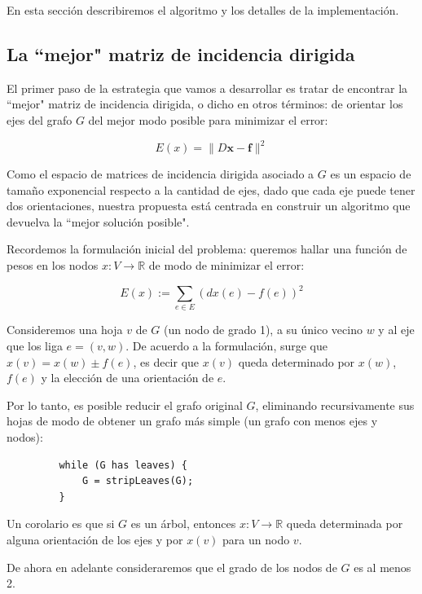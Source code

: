 \documentclass[conference,compsoc,a4paper]{IEEEtran}
\begin{document}
En esta sección describiremos el algoritmo y los detalles de la 
implementación.

\subsection{La ``mejor" matriz de incidencia dirigida}

El primer paso de la estrategia que vamos a desarrollar es tratar de 
encontrar la ``mejor" matriz de incidencia dirigida, o dicho en otros 
términos: de orientar los ejes del grafo $G$ del mejor modo posible para 
minimizar el error:

$$E(x) = \|D\bm{x}-\bm{f}\|^2$$
 
Como el espacio de matrices de incidencia dirigida asociado a $G$ es un 
espacio de tamaño exponencial respecto a la cantidad de ejes, dado que 
cada eje puede tener dos orientaciones, nuestra propuesta está centrada 
en construir un algoritmo que devuelva la ``mejor solución posible".

\bigskip


Recordemos la formulación inicial del problema: queremos hallar una 
función de pesos en los nodos $x: V \rightarrow \mathbb{R}$ de modo de 
minimizar el error:

$$E(x) := \sum_{e \in E} (dx(e) - f(e))^2$$

Consideremos una hoja $v$ de $G$ (un nodo de grado 1), a su único 
vecino $w$ y al eje que los liga $e=(v,w)$. De acuerdo a la formulación, 
surge que $x(v) = x(w) \pm f(e)$, es decir que $x(v)$ queda 
determinado por $x(w)$, $f(e)$ y la elección de una orientación de $e$.

\smallskip

Por lo tanto, es posible reducir el grafo original $G$, eliminando 
recursivamente sus  hojas de modo de obtener un grafo más simple (un 
grafo con menos ejes y nodos):

\begin{verbatim}
         while (G has leaves) {
             G = stripLeaves(G);
         }
\end{verbatim}

Un corolario es que si $G$ es un árbol, entonces $x: V 
\rightarrow \mathbb{R}$ queda determinada por alguna orientación de 
los ejes y por $x(v)$ para un nodo $v$.

\smallskip

De ahora en adelante consideraremos que el grado de los nodos de $G$ es 
al menos 2.
 
\end{document}
